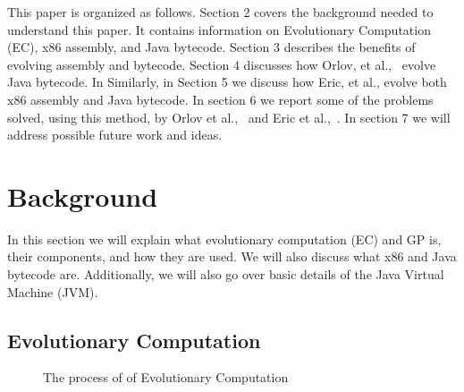 \documentclass{sig-alternate}
\begin{document}
This paper is organized as follows. Section 2 covers the background needed to understand this paper. It contains information on Evolutionary Computation (EC), x86 assembly, and Java bytecode. Section 3 describes the benefits of evolving assembly and bytecode. Section 4 discusses how Orlov, et al.,~\cite{FINCH:2011} evolve Java bytecode. In Similarly, in Section 5 we discuss how Eric, et al., evolve both x86 assembly and Java bytecode. In section 6 we report some of the problems solved, using this method, by Orlov et al.,~\cite{FINCH:2011} and Eric et al.,~\cite{Assembly:2010}. In section 7 we will address possible future work and ideas.
	
	

\section{Background}


In this section we will explain what evolutionary computation (EC) and GP is, their components, and how they are used. We will also discuss what x86 and Java bytecode are. Additionally, we will also go over basic details of the Java Virtual Machine (JVM).
\subsection{Evolutionary Computation}
\begin{figure}
\centering
{}

\caption{The process of of Evolutionary Computation}
\label{ECdiagram}
\end{figure}
\end{document}
